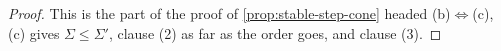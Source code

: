 \begin{proof}
\leanok
This is the part of the proof of \ref{prop:stable-step-cone} headed (b)$\Leftrightarrow$(c), (c)
gives $\Sigma \le \Sigma'$, clause (2) as far as the order goes, and clause (3).
\end{proof}

